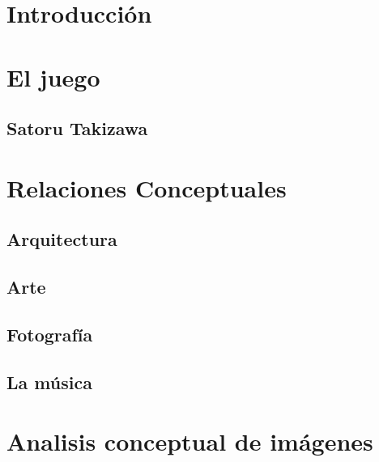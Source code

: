 \documentclass[12pt]{article}
\begin{document}
\newpage
\newpage
\renewcommand{\listfigurename}{Lita de figuras}
\thispagestyle{empty}
\listoffigures


\newpage
\section{Introducción}

\section{El juego}

\subsection{Satoru Takizawa}

\section{Relaciones Conceptuales}

\subsection{Arquitectura}

\subsection{Arte}

\subsection{Fotografía}

\subsection{La música}


%

\section{Analisis conceptual de imágenes}
\end{document}
